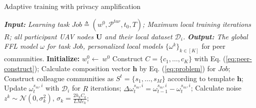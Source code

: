 \documentclass[lettersize,journal]{IEEEtran}
\begin{document}
\begin{algorithm}[!t]%
\caption{Adaptive training with privacy amplification}
\label{algorithm1}
	\begin{algorithmic} [1]
    \State \textit{\textbf{ Input: }Learning task $Job\triangleq(w^0,\mathcal{P}^{tar},t_0, T)$; Maximum
local training iterations $R$; all participant UAV nodes $\mathbf{U}$ and their local dataset $\mathcal{D}_i$.}
    \State \textit{\textbf{Output: }The global FFL model $\omega$ for task $Job$, personalized local models $\{ \omega^{k}\}_{k \in [K]}$} for peer communities.
            \State \textbf{Initialize:} $w^{0}_{i} \leftarrow\ w^{0}$%
            \State Construct $C=\{ c_{1}, \ldots , c_{K} \}$ with Eq. (\ref{eq:peer-construct});
            \State Calculate composition vector $\mathbf{h}$ by Eq. (\ref{eq:problem}) for $Job$;
            \State Construct colleague communities as $S^t=\{s_{1}, \ldots , s_{M}\}$ according to template $\mathbf{h}$;
                        \State Update $\omega_{t}^{s_{m},i}$ with $\mathcal{D}_i$ for $R$ iterations;
                        \State $\Delta \omega_{t}^{s_{m},i}=\omega_{t-1}^{s_{m},i}-\omega_{t}^{s_{m},i}$;
                        \State Calculate noise $z^{k} \sim \mathcal{N}\left(0, \sigma_{k}^2\right)$, $\sigma_{k}=\frac{2 h_{k} C_{k}}{L M\varepsilon_{k}}$;

\end{algorithmic}
\end{algorithm}
\end{document}

